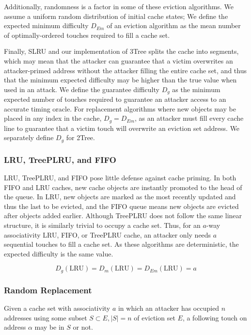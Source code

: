 \documentclass[letterpaper]{article}
\begin{document}
Additionally, randomness is a factor in some of these eviction algorithms.
We assume a uniform random distribution of initial cache states;
We define the expected minimum difficulty $D_{Em}$ of an eviction algorithm
as the mean number of optimally-ordered touches required to fill a cache set.

Finally, SLRU and our implementation of 3Tree splits the cache into segments,
which may mean that the attacker can guarantee that a victim overwrites
an attacker-primed address without the attacker filling the entire cache set,
and thus that the minimum expected difficulty may be higher than the true value
when used in an attack.
We define the guarantee difficulty $D_g$ as the minimum expected number of touches
required to guarantee an attacker access to an accurate timing oracle.
For replacement algorithms where new objects may be placed in any index in the cache,
$D_g = D_{Em}$, as an attacker must fill every cache line to guarantee
that a victim touch will overwrite an eviction set address.
We separately define $D_g$ for 2Tree.

\subsubsection{LRU, TreePLRU, and FIFO}
LRU, TreePLRU, and FIFO pose little defense against cache priming.
In both FIFO and LRU caches, new cache objects are instantly promoted to the head of the queue.
In LRU, new objects are marked as the most recently updated and thus the last to be evicted,
and the FIFO queue means new objects are evicted after objects added earlier.
Although TreePLRU does not follow the same linear structure,
it is similarly trivial to occupy a cache set.
Thus, for an $a$-way associativity LRU, FIFO, or TreePLRU cache, an attacker only needs
$a$ sequential touches to fill a cache set.
As these algorithms are deterministic, the expected difficulty is the same value.

\begin{equation}\label{LRUExpectedD}
  D_g(\text{LRU}) = D_m(\text{LRU}) = D_{Em}(\text{LRU}) = a
\end{equation}

\subsubsection{Random Replacement}
Given a cache set with associativity $a$ in which an attacker has occupied $n$ addresses
using some subset $S \subset E, |S| = n$ of eviction set $E$,
a following touch on address $\alpha$ may be in $S$ or not.
\end{document}
